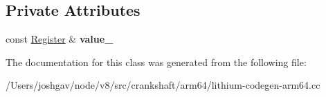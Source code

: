 \subsection*{Private Attributes}
\begin{DoxyCompactItemize}
\item 
const \hyperlink{structv8_1_1internal_1_1_register}{Register} \& {\bfseries value\+\_\+}\hypertarget{classv8_1_1internal_1_1_branch_if_heap_number_ad6dbe548984f03275677db3dc26c7629}{}\label{classv8_1_1internal_1_1_branch_if_heap_number_ad6dbe548984f03275677db3dc26c7629}

\end{DoxyCompactItemize}


The documentation for this class was generated from the following file\+:\begin{DoxyCompactItemize}
\item 
/\+Users/joshgav/node/v8/src/crankshaft/arm64/lithium-\/codegen-\/arm64.\+cc\end{DoxyCompactItemize}
